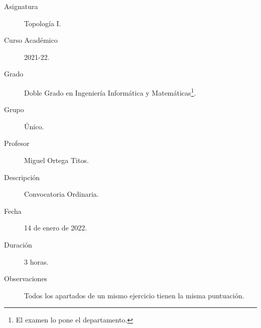 \documentclass[12pt]{article}
\begin{document}

    
    

    \begin{description}
        \item[Asignatura] Topología I.
        \item[Curso Académico] 2021-22.
        \item[Grado] Doble Grado en Ingeniería Informática y Matemáticas\footnote{El examen lo pone el departamento.}.
        \item[Grupo] Único.
        \item[Profesor] Miguel Ortega Titos.
        \item[Descripción] Convocatoria Ordinaria.
        \item[Fecha] 14 de enero de 2022.
        \item[Duración] 3 horas.
        \item[Observaciones] Todos los apartados de un mismo ejercicio tienen la misma puntuación.
    
    \end{description}
    \newpage
    
\end{document}
